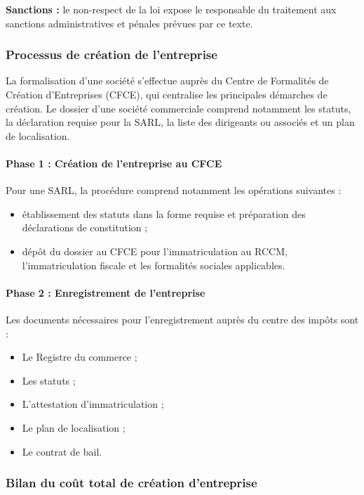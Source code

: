 \textbf{Sanctions :} le non-respect de la loi expose le responsable du traitement aux sanctions administratives et pénales prévues par ce texte\cite{loi2024_donnees}.

\subsubsection{Processus de création de l'entreprise}

La formalisation d'une société s'effectue auprès du Centre de Formalités de Création d'Entreprises (CFCE), qui centralise les principales démarches de création. Le dossier d'une société commerciale comprend notamment les statuts, la déclaration requise pour la SARL, la liste des dirigeants ou associés et un plan de localisation\cite{minpmeesa_cfce}.

\paragraph{Phase 1 : Création de l'entreprise au CFCE }

\indent Pour une SARL, la procédure comprend notamment les opérations suivantes :
\begin{itemize}
    \item établissement des statuts dans la forme requise et préparation des déclarations de constitution ;
    \item dépôt du dossier au CFCE pour l'immatriculation au RCCM, l'immatriculation fiscale et les formalités sociales applicables.
\end{itemize}

\paragraph{Phase 2 : Enregistrement de l'entreprise}

\indent Les documents nécessaires pour l'enregistrement auprès du centre des impôts sont :
\begin{itemize}
    \item Le Registre du commerce ;
    \item Les statuts ;
    \item L'attestation d'immatriculation ;
    \item Le plan de localisation ;
    \item Le contrat de bail.
\end{itemize}

\subsubsection{Bilan du coût total de création d'entreprise}

